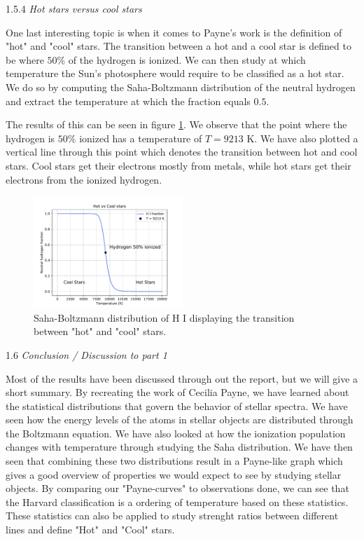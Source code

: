 \documentclass[a4paper,11.5pt,]{article}
\begin{document}
\begin{multicols}{2}
\begin{center}
1.5.4\textit{ Hot stars versus cool stars}
\end{center}

One last interesting topic is when it comes to Payne's work is the definition of "hot" and "cool" stars. The transition between a hot and a cool star is defined to be where $50\%$ of the hydrogen is ionized. We can then study at which temperature the Sun's photosphere would require to be classified as a hot star. We do so by computing the Saha-Boltzmann distribution of the neutral hydrogen and extract the temperature at which the fraction equals $0.5$.

The results of this can be seen in figure \ref{fig:11}. We observe that the point where the hydrogen is $50\%$ ionized has a temperature of $T = 9213$ K. We have also plotted a vertical line through this point which denotes the transition between hot and cool stars. Cool stars get their electrons mostly from metals, while hot stars get their electrons from the ionized hydrogen.

\begin{figure}[H]
	\centering
	\includegraphics[width=0.5\textwidth]{SSA/figures/hotcool.pdf}
	\caption{Saha-Boltzmann distribution of H I displaying the transition between "hot" and "cool" stars.}
	\label{fig:11}
\end{figure}

\begin{center}
1.6\textit{ Conclusion / Discussion to part 1}
\end{center}
Most of the results have been discussed through out the report, but we will give a short summary. By recreating the work of Cecilia Payne, we have learned about the statistical distributions that govern the behavior of stellar spectra. We have seen how the energy levels of the atoms in stellar objects are distributed through the Boltzmann equation. We have also looked at how the ionization population changes with temperature through studying the Saha distribution. We have then seen that combining these two distributions result in a Payne-like graph which gives a good overview of properties we would expect to see by studying stellar objects. By comparing our "Payne-curves" to observations done, we can see that the Harvard classification is a ordering of temperature based on these statistics. These statistics can also be applied to study strenght ratios between different lines and define "Hot" and "Cool" stars. 



\end{multicols}
\end{document}
